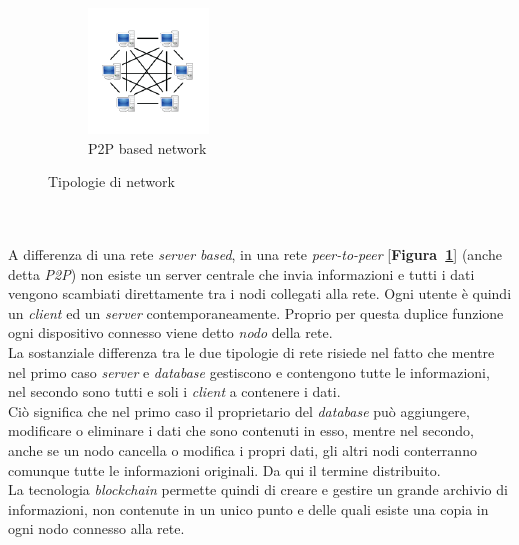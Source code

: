 \documentclass[11pt]{thesistemp}
\begin{document}
\begin{figure}[h]
\begin{subfigure}[h]{0.3\textwidth}
        \includegraphics[width=\textwidth]{p2p-based-net.png}
        \caption{P2P based network}
        \label{fig:p2p-based-net}
    \end{subfigure}
    \caption{Tipologie di network}
    \label{fig:net}
\end{figure}\\\\
A differenza di una rete \textit{server based}, in una rete \textit{peer-to-peer} [\textbf{Figura~\ref{fig:p2p-based-net}}] (anche detta \textit{P2P}) non esiste un server centrale che invia informazioni e tutti i dati vengono scambiati direttamente tra i nodi collegati alla rete. Ogni utente è quindi un \textit{client} ed un \textit{server} contemporaneamente.
Proprio per questa duplice funzione ogni dispositivo connesso viene detto \textit{nodo} della rete.\\
La sostanziale differenza tra le due tipologie di rete risiede nel fatto che mentre nel primo caso \textit{server} e \textit{database} gestiscono e contengono tutte le informazioni, nel secondo sono tutti e soli i \textit{client} a contenere i dati.\\
Ciò significa che nel primo caso il proprietario del \textit{database} può aggiungere, modificare o eliminare i dati che sono contenuti in esso, mentre nel secondo, anche se un nodo cancella o modifica i propri dati, gli altri nodi conterranno comunque tutte le informazioni originali. Da qui il termine distribuito.\\
La tecnologia \textit{blockchain} permette quindi di creare e gestire un grande archivio di informazioni, non contenute in un unico punto e delle quali esiste una copia in ogni nodo connesso alla rete.
\end{document}

